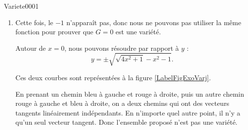 \begin{corrige}{Variete0001}
\begin{enumerate}
		\item
			Cette fois, le $-1$ n'apparaît pas, donc nous ne pouvons pas utiliser la même fonction pour prouver que $G=0$ est une variété.

			Autour de $x=0$, nous pouvons résoudre par rapport à $y$ :
			\begin{equation}
				y=\pm\sqrt{  \sqrt{4x^2+1}-x^2-1   }.
			\end{equation}

			Ces deux courbes sont représentées à la figure \ref{LabelFigExoVarj}.	
			\newcommand{\CaptionFigExoVarj}{Ce à quoi ça ressemble. En bleu la partie sans le signe, et en rouge avec le signe moins.}
			

			En prenant un chemin bleu à gauche et rouge à droite, puis un autre chemin rouge à gauche et bleu à droite, on a deux chemins qui ont des vecteurs tangents linéairement indépendants. 
            En n'importe quel autre point, il n'y a qu'un seul vecteur tangent. Donc l'ensemble proposé n'est pas une variété.


	\end{enumerate}

\end{corrige}
